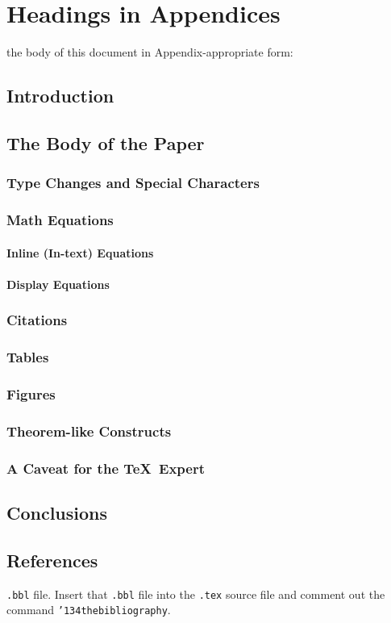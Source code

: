\documentclass[sigconf]{acmart}
\begin{document}
\appendix

\section{Headings in Appendices}

the body of this document in Appendix-appropriate form:

\subsection{Introduction}
\subsection{The Body of the Paper}
\subsubsection{Type Changes and  Special Characters}
\subsubsection{Math Equations}
\paragraph{Inline (In-text) Equations}
\paragraph{Display Equations}
\subsubsection{Citations}
\subsubsection{Tables}
\subsubsection{Figures}
\subsubsection{Theorem-like Constructs}
\subsubsection*{A Caveat for the \TeX\ Expert}
\subsection{Conclusions}
\subsection{References}

\texttt{.bbl} file.  Insert that \texttt{.bbl} file into the
\texttt{.tex} source file and comment out the command
\texttt{{\char'134}thebibliography}.




 
\end{document}
